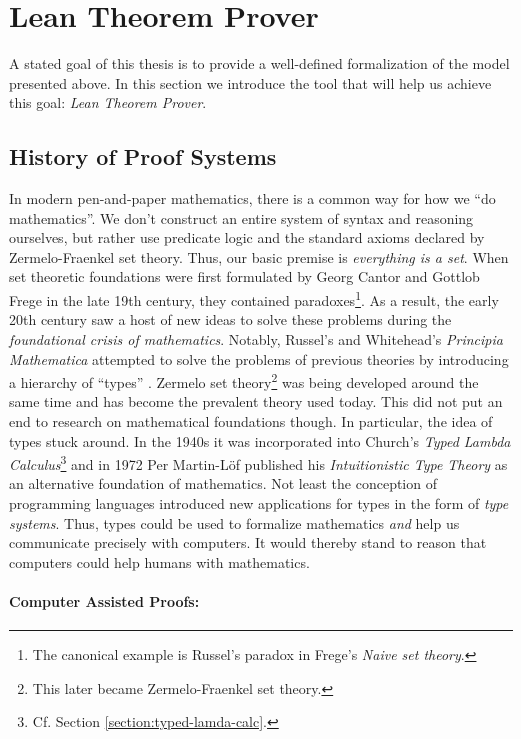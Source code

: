 \section{Lean Theorem Prover}
\label{section:intro-lean}

A stated goal of this thesis is to provide a well-defined formalization of the model presented above. 
In this section we introduce the tool that will help us achieve this goal: \emph{Lean Theorem Prover}.

\subsection{History of Proof Systems}
\label{section:history-proof-sys}

In modern pen-and-paper mathematics, there is a common way for how we ``do mathematics''.
We don't construct an entire system of syntax and reasoning ourselves, but rather use predicate logic and the standard axioms declared by Zermelo-Fraenkel set theory.
Thus, our basic premise is \emph{everything is a set}.
When set theoretic foundations were first formulated by Georg Cantor and Gottlob Frege in the late 19th century, they contained paradoxes\footnote{The canonical example is Russel's paradox in Frege's \emph{Naive set theory}.}.
As a result, the early 20th century saw a host of new ideas to solve these problems during the \emph{foundational crisis of mathematics}.
Notably, Russel's and Whitehead's \emph{Principia Mathematica} attempted to solve the problems of previous theories by introducing a hierarchy of ``types'' \cite{principia}.
Zermelo set theory\footnote{This later became Zermelo-Fraenkel set theory.} was being developed around the same time and has become the prevalent theory used today.
This did not put an end to research on mathematical foundations though.
In particular, the idea of types stuck around.
In the 1940s it was incorporated into Church's \emph{Typed Lambda Calculus}\footnote{Cf. Section \ref{section:typed-lamda-calc}.} and in 1972 Per Martin-Löf published his \emph{Intuitionistic Type Theory} \cite{loef} as an alternative foundation of mathematics.
Not least the conception of programming languages introduced new applications for types in the form of \emph{type systems}.
Thus, types could be used to formalize mathematics \emph{and} help us communicate precisely with computers.
It would thereby stand to reason that computers could help humans with mathematics.

\paragraph{Computer Assisted Proofs:}

